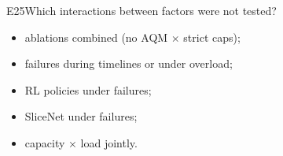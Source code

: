 \begin{qa}{E25}{Which interactions between factors were not tested?}
\begin{itemize}
\item ablations combined (no AQM $\times$ strict caps);
\item failures during timelines or under overload;
\item RL policies under failures;
\item SliceNet under failures;
\item capacity $\times$ load jointly.
\end{itemize}
\end{qa}
